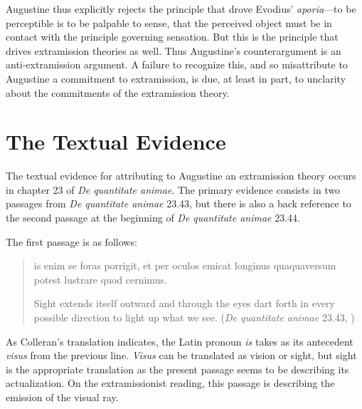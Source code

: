 \documentclass[12pt]{article}
\begin{document}
Augustine thus explicitly rejects the principle that drove Evodius' \emph{aporia}---to be perceptible is to be palpable to sense, that the perceived object must be in contact with the principle governing sensation. But this is the principle that drives extramission theories as well. Thus Augustine's counterargument is an anti-extramis\-sion argument. A failure to recognize this, and so misattribute to Augustine a commitment to extramission, is due, at least in part, to unclarity about the commitments of the extramission theory.


\section{The Textual Evidence} %
\label{sec:the_textual_evidence}

The textual evidence for attributing to Augustine an extramission theory occurs in chapter 23 of \emph{De quantitate animae}. The primary evidence consists in two passages from \emph{De quantitate animae} 23.43, but there is also a back reference to the second passage at the beginning of \emph{De quantitate animae} 23.44.

The first passage is as follows:
\begin{quote}
	is enim se foras porrigit, et per oculos emicat longinus quaquaversum potest lustrare quod cernimus. 
	
	Sight extends itself outward and through the eyes dart forth in every possible direction to light up what we see. (\emph{De quantitate animae} 23.43, \citealt[66]{Colleran:1949ys})
\end{quote}
As Colleran's translation indicates, the Latin pronoun \emph{is} takes as its antecedent \emph{visus} from the previous line. \emph{Visus} can be translated as vision or sight, but sight is the appropriate translation as the present passage seems to be describing its actualization. On the extramissionist reading, this passage is describing the emission of the visual ray.
\end{document}
